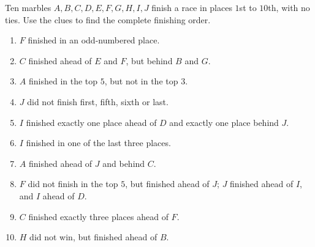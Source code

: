 Ten marbles $A,B,C,D,E,F,G,H,I,J$ finish a race in places $1$st to $10$th, with no ties. Use the clues to find the complete finishing order.
\begin{enumerate}
\item $F$ finished in an odd-numbered place.
\item $C$ finished ahead of $E$ and $F$, but behind $B$ and $G$.
\item $A$ finished in the top $5$, but not in the top $3$.
\item $J$ did not finish first, fifth, sixth or last.
\item $I$ finished exactly one place ahead of $D$ and exactly one place behind $J$.
\item $I$ finished in one of the last three places.
\item $A$ finished ahead of $J$ and behind $C$.
\item $F$ did not finish in the top $5$, but finished ahead of $J$; $J$ finished ahead of $I$, and $I$ ahead of $D$.
\item $C$ finished exactly three places ahead of $F$.
\item $H$ did not win, but finished ahead of $B$.
\end{enumerate}
